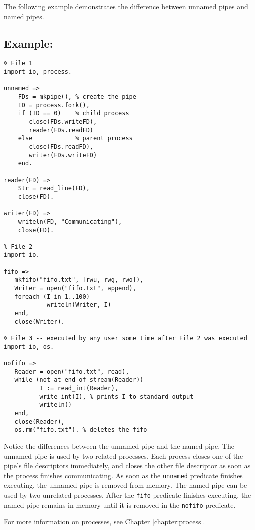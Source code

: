 {The following example demonstrates the difference between unnamed pipes and named pipes.
\subsection*{Example:}
\begin{verbatim}
% File 1
import io, process.

unnamed =>
    FDs = mkpipe(), % create the pipe
    ID = process.fork(),
    if (ID == 0)    % child process
       close(FDs.writeFD),
       reader(FDs.readFD)
    else            % parent process
       close(FDs.readFD),
       writer(FDs.writeFD)
    end.
    
reader(FD) =>
    Str = read_line(FD),
    close(FD).

writer(FD) =>
    writeln(FD, "Communicating"),
    close(FD).

% File 2
import io.

fifo =>
   mkfifo("fifo.txt", [rwu, rwg, rwo]),
   Writer = open("fifo.txt", append),
   foreach (I in 1..100)
            writeln(Writer, I)
   end,
   close(Writer).

% File 3 -- executed by any user some time after File 2 was executed
import io, os.

nofifo =>
   Reader = open("fifo.txt", read),
   while (not at_end_of_stream(Reader))
          I := read_int(Reader),
          write_int(I), % prints I to standard output
          writeln()
   end,
   close(Reader),
   os.rm("fifo.txt"). % deletes the fifo
\end{verbatim}

Notice the differences between the unnamed pipe and the named pipe.  The unnamed pipe is used by two related processes.  Each process closes one of the pipe's file descriptors immediately, and closes the other file descriptor as soon as the process finishes communicating.  As soon as the \texttt{unnamed} predicate finishes executing, the unnamed pipe is removed from memory.  The named pipe can be used by two unrelated processes.  After the \texttt{fifo} predicate finishes executing, the named pipe remains in memory until it is removed in the \texttt{nofifo} predicate.

For more information on processes, see Chapter \ref{chapter:process}.

}
